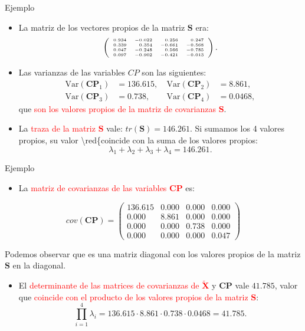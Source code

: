 \documentclass[
  ignorenonframetext,
]{beamer}
\providecommand{\tightlist}{%
  \setlength{\itemsep}{0pt}\setlength{\parskip}{0pt}}
\newcommand\red[1]{\textcolor{red}{#1}}
\begin{document}
\begin{frame}{Ejemplo}
\protect\hypertarget{ejemplo-16}{}
\begin{itemize}
\item
  La matriz de los vectores propios de la matriz \(\mathbf{S}\) era: \[
  {\tiny 
  \left(
  \begin{array}{rrrr}
  0.934 & -0.022 & 0.256 & 0.247 \\
   0.339 & 0.354 & -0.661 & -0.568 \\
   0.047 & -0.248 & 0.566 & -0.785 \\
   0.097 & -0.902 & -0.421 & -0.013 
  \end{array}\right).}
  \]
\item
  Las varianzas de las variables \(CP\) son las siguientes: \[
  \begin{array}{llcll}
  \mbox{Var}(\mathbf{CP}_1) & =136.615,\ & \mbox{Var}(\mathbf{CP}_2) & =8.861,\\ 
  \mbox{Var}(\mathbf{CP}_3) & =0.738,\ &\mbox{Var}(\mathbf{CP}_4) & =0.0468,
  \end{array}
  \] que \red{son los valores propios de la matriz de
  covarianzas $\mathbf{S}$}.
\item
  La \red{traza de la matriz $\mathbf{S}$} vale:
  \(tr(\mathbf{S})=146.261\). Si sumamos los 4 valores propios, su valor
  \textbackslash red\{coincide con la suma de los valores propios:
  \[\lambda_1+\lambda_2+\lambda_3+\lambda_4 = 146.261.\]
\end{itemize}
\end{frame}

\begin{frame}{Ejemplo}
\protect\hypertarget{ejemplo-17}{}
\begin{itemize}
\tightlist
\item
  La \red{matriz de covarianzas de las variables $\mathbf{CP}$} es:
\end{itemize}

\[
cov(\mathbf{CP})=
\left(
\begin{array}{rrrr}
136.615 & 0.000 & 0.000 & 0.000 \\
 0.000 & 8.861 & 0.000 & 0.000 \\
 0.000 & 0.000 & 0.738 & 0.000 \\
 0.000 & 0.000 & 0.000 & 0.047 
\end{array}
\right)
\]

Podemos observar que es una matriz diagonal con los valores propios de
la matriz \(\mathbf{S}\) en la diagonal.

\begin{itemize}
\tightlist
\item
  El
  \red{determinante de las matrices de covarianzas de $\tilde{\mathbf{X}}$}
  y \(\mathbf{CP}\) vale \(41.785\), valor que
  \red{coincide con el producto de los valores
  propios de la matriz $\mathbf{S}$}: \[
  \prod_{i=1}^4 \lambda_i= 136.615\cdot 8.861\cdot 0.738\cdot 0.0468 = 41.785.
  \]
\end{itemize}
\end{frame}
\end{document}
